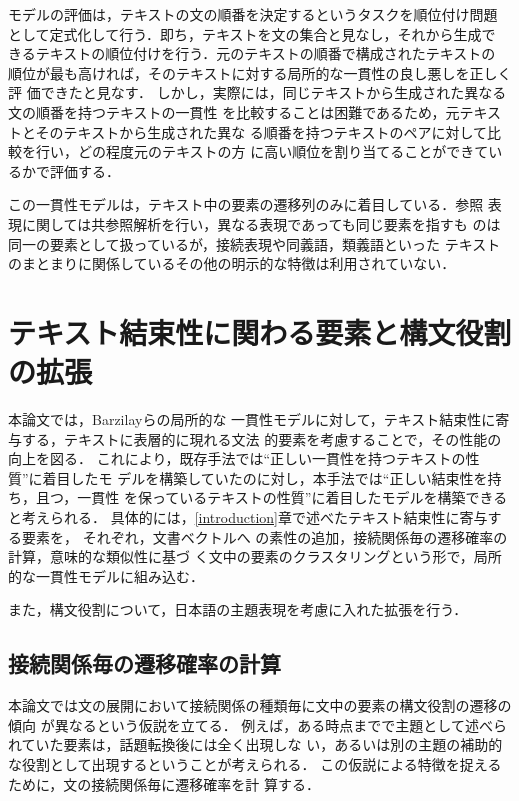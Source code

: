 \documentclass[japanese]{jnlp_1.4}
\begin{document}
 モデルの評価は，テキストの文の順番を決定するというタスクを順位付け問題
 として定式化して行う．即ち，テキストを文の集合と見なし，それから生成で
 きるテキストの順位付けを行う．元のテキストの順番で構成されたテキストの
 順位が最も高ければ，そのテキストに対する局所的な一貫性の良し悪しを正しく評
 価できたと見なす．
 しかし，実際には，同じテキストから生成された異なる文の順番を持つテキストの一貫性
 を比較することは困難であるため，元テキストとそのテキストから生成された異な
 る順番を持つテキストのペアに対して比較を行い，どの程度元のテキストの方
 に高い順位を割り当てることができているかで評価する．

   この一貫性モデルは，テキスト中の要素の遷移列のみに着目している．参照
   表現に関しては共参照解析を行い，異なる表現であっても同じ要素を指すも
   のは同一の要素として扱っているが，接続表現や同義語，類義語といった
   テキストのまとまりに関係しているその他の明示的な特徴は利用されていない．
   


 \section{テキスト結束性に関わる要素と構文役割の拡張}

 本論文では，Barzilayら\cite{barzilay2008}の局所的な
 一貫性モデルに対して，テキスト結束性に寄与する，テキストに表層的に現れる文法
 的要素を考慮することで，その性能の向上を図る．
 これにより，既存手法では``正しい一貫性を持つテキストの性質''に着目したモ
 デルを構築していたのに対し，本手法では``正しい結束性を持ち，且つ，一貫性
 を保っているテキストの性質''に着目したモデルを構築できると考えられる．
 具体的には，\ref{introduction}章で述べたテキスト結束性に寄与する要素を，
 それぞれ，文書ベクトルへ
 の素性の追加，接続関係毎の遷移確率の計算，意味的な類似性に基づ
 く文中の要素のクラスタリングという形で，局所的な一貫性モデルに組み込む．

 また，構文役割について，日本語の主題表現を考慮に入れた拡張を行う．


  \subsection{接続関係毎の遷移確率の計算}

  本論文では文の展開において接続関係の種類毎に文中の要素の構文役割の遷移の傾向
  が異なるという仮説を立てる．
  例えば，ある時点までで主題として述べられていた要素は，話題転換後には全く出現しな
  い，あるいは別の主題の補助的な役割として出現するということが考えられる．
  この仮説による特徴を捉えるために，文の接続関係毎に遷移確率を計
  算する．
\end{document}
